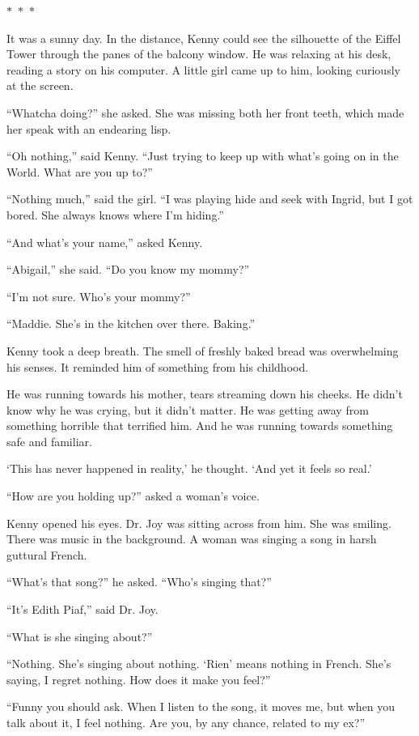 \documentclass{memoir}
\newcommand{\starbreak}{%
\begin{center}
  $\ast$~$\ast$~$\ast$
\end{center}
}
\begin{document}
\starbreak

It was a sunny day. In the distance, Kenny could see the silhouette of the Eiffel Tower through the panes of the balcony window. He was relaxing at his desk, reading a story on his computer. A little girl came up to him, looking curiously at the screen.

``Whatcha doing?'' she asked. She was missing both her front teeth, which made her speak with an endearing lisp.

``Oh nothing,'' said Kenny. ``Just trying to keep up with what's going on in the World. What are you up to?''

``Nothing much,'' said the girl. ``I was playing hide and seek with Ingrid, but I got bored. She always knows where I'm hiding.'' 

``And what's your name,'' asked Kenny.

``Abigail,'' she said. ``Do you know my mommy?''

``I'm not sure. Who's your mommy?''

``Maddie. She's in the kitchen over there. Baking.''

Kenny took a deep breath. The smell of freshly baked bread was overwhelming his senses. It reminded him of something from his childhood. 

He was running towards his mother, tears streaming down his cheeks. He didn't know why he was crying, but it didn't matter. He was getting away from something horrible that terrified him. And he was running towards something safe and familiar. 

`This has never happened in reality,' he thought. `And yet it feels so real.'

``How are you holding up?'' asked a woman's voice.

Kenny opened his eyes. Dr. Joy was sitting across from him. She was smiling. There was music in the background. A woman was singing a song in harsh guttural French.

``What's that song?'' he asked. ``Who's singing that?''

``It's Edith Piaf,'' said Dr. Joy.

``What is she singing about?''

``Nothing. She's singing about nothing. `Rien' means nothing in French. She's saying, I regret nothing. How does it make you feel?''

``Funny you should ask. When I listen to the song, it moves me, but when you talk about it, I feel nothing. Are you, by any chance, related to my ex?''
\end{document}
